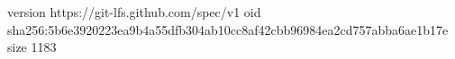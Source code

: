 version https://git-lfs.github.com/spec/v1
oid sha256:5b6e3920223ea9b4a55dfb304ab10cc8af42cbb96984ea2cd757abba6ae1b17e
size 1183
